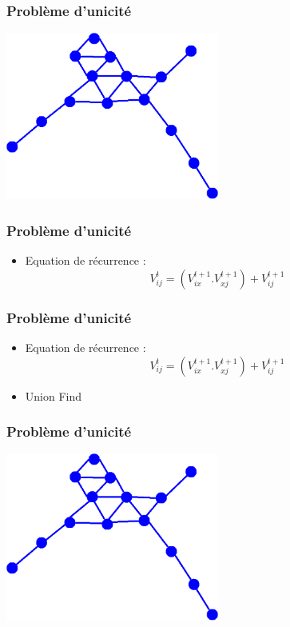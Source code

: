 \documentclass{beamer}
\begin{document}
    \begin{frame}
        \frametitle{Probl\`eme d'unicit\'e}
        \begin{center}
        \includegraphics[width=7cm]{./graphe2.png}
        \end{center}
    \end{frame}
    \begin{frame}
        \frametitle{Probl\`eme d'unicit\'e}
        \begin{itemize}
        \item Equation de r\'ecurrence : \[ V_{ij}^t = (V_{ix}^{t+1} . V_{xj}^{t+1}) + V_{ij}^{t+1}  \]
        \end{itemize}
    \end{frame}
    \begin{frame}
        \frametitle{Probl\`eme d'unicit\'e}
        \begin{itemize}
        \item Equation de r\'ecurrence : \[ V_{ij}^t = (V_{ix}^{t+1} . V_{xj}^{t+1}) + V_{ij}^{t+1}  \]
        \item Union Find
        \end{itemize}
    \end{frame}
    \begin{frame}
        \frametitle{Probl\`eme d'unicit\'e}
        \begin{center}
        \includegraphics[width=7cm]{./graphe2.png}
        \end{center}
    \end{frame}
\end{document}
